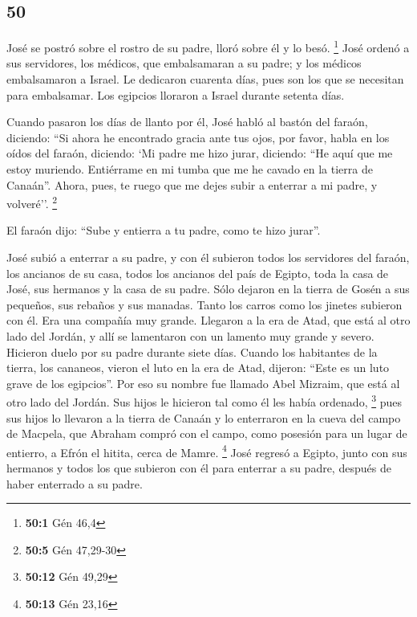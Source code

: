\begin{paracol}{2}
\hypertarget{section-98}{%
\section{50}\label{section-98}}

 José se postró sobre el rostro de su padre, lloró sobre
él y lo besó. \footnote{\textbf{50:1} Gén 46,4}  José
ordenó a sus servidores, los médicos, que embalsamaran a su padre; y los
médicos embalsamaron a Israel.  Le dedicaron cuarenta
días, pues son los que se necesitan para embalsamar. Los egipcios
lloraron a Israel durante setenta días.

 Cuando pasaron los días de llanto por él, José habló al
bastón del faraón, diciendo: ``Si ahora he encontrado gracia ante tus
ojos, por favor, habla en los oídos del faraón, diciendo: 
`Mi padre me hizo jurar, diciendo: ``He aquí que me estoy muriendo.
Entiérrame en mi tumba que me he cavado en la tierra de Canaán''. Ahora,
pues, te ruego que me dejes subir a enterrar a mi padre, y volveré''.
\footnote{\textbf{50:5} Gén 47,29-30}

 El faraón dijo: ``Sube y entierra a tu padre, como te
hizo jurar''.

 José subió a enterrar a su padre, y con él subieron todos
los servidores del faraón, los ancianos de su casa, todos los ancianos
del país de Egipto,  toda la casa de José, sus hermanos y
la casa de su padre. Sólo dejaron en la tierra de Gosén a sus pequeños,
sus rebaños y sus manadas.  Tanto los carros como los
jinetes subieron con él. Era una compañía muy grande. 
Llegaron a la era de Atad, que está al otro lado del Jordán, y allí se
lamentaron con un lamento muy grande y severo. Hicieron duelo por su
padre durante siete días.  Cuando los habitantes de la
tierra, los cananeos, vieron el luto en la era de Atad, dijeron: ``Este
es un luto grave de los egipcios''. Por eso su nombre fue llamado Abel
Mizraim, que está al otro lado del Jordán.  Sus hijos le
hicieron tal como él les había ordenado, \footnote{\textbf{50:12} Gén
  49,29}  pues sus hijos lo llevaron a la tierra de
Canaán y lo enterraron en la cueva del campo de Macpela, que Abraham
compró con el campo, como posesión para un lugar de entierro, a Efrón el
hitita, cerca de Mamre. \footnote{\textbf{50:13} Gén 23,16}
 José regresó a Egipto, junto con sus hermanos y todos
los que subieron con él para enterrar a su padre, después de haber
enterrado a su padre.


\end{paracol}
